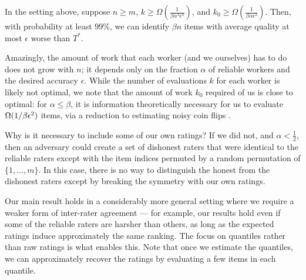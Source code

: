 \begin{theorem}
\label{thm:intro}
In the setting above, suppose $n \geq m$, 
$k \geq \Omega(\tfrac{1}{\beta\alpha^3\epsilon^4})$, and 
$k_0 \geq \Omega(\tfrac{1}{\beta\alpha\epsilon^2})$. Then, with probability 
at least $99\%$, we can identify $\beta n$ items with average quality at most 
$\epsilon$ worse than $T^*$.
\end{theorem}
Amazingly, the amount of work that each worker (and we ourselves) has 
to do does not grow with $n$; it depends only on the fraction $\alpha$ of 
reliable workers and the desired accuracy $\epsilon$. While the number 
of evaluations $k$ for each worker is likely not optimal, we note that 
the amount of work $k_0$ required of us is close to optimal: 
for $\alpha \le \beta$, it is information theoretically necessary for 
us to evaluate $\Omega(1/\beta\epsilon^2)$ items, via a reduction to estimating 
noisy coin flips .

Why is it necessary to include some of our own ratings? 
If we did not, and $\alpha < \frac{1}{2}$, then an adversary could create a set of 
dishonest raters that were identical to the reliable raters except with the 
item indices permuted by a random permutation of $\{1,\ldots,m\}$. In this case, 
there is no way to distinguish the honest from the dishonest raters except by 
breaking the symmetry with our own ratings.

Our main result holds in a considerably more general setting where we require a 
weaker form of inter-rater agreement --- for example, our results hold even if 
some of the reliable raters are harsher than others, as long as 
the expected ratings induce approximately the same ranking.
The focus on quantiles rather than raw ratings is what enables this. 
Note that once we estimate the quantiles, we can approximately recover the 
ratings by evaluating a few items in each quantile.

